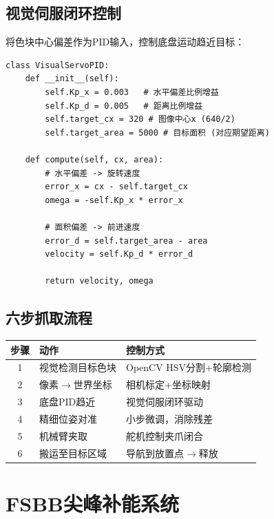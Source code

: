 \documentclass[12pt,a4paper]{ctexart}
\begin{document}
\subsection{视觉伺服闭环控制}

将色块中心偏差作为PID输入，控制底盘运动趋近目标：

\begin{lstlisting}[style=pythonstyle, caption={视觉伺服PID闭环底盘控制}]
class VisualServoPID:
    def __init__(self):
        self.Kp_x = 0.003   # 水平偏差比例增益
        self.Kp_d = 0.005   # 距离比例增益
        self.target_cx = 320 # 图像中心x (640/2)
        self.target_area = 5000 # 目标面积 (对应期望距离)

    def compute(self, cx, area):
        # 水平偏差 -> 旋转速度
        error_x = cx - self.target_cx
        omega = -self.Kp_x * error_x

        # 面积偏差 -> 前进速度
        error_d = self.target_area - area
        velocity = self.Kp_d * error_d

        return velocity, omega
\end{lstlisting}

\subsection{六步抓取流程}

\begin{center}
\begin{tabular}{cll}
\toprule
\textbf{步骤} & \textbf{动作} & \textbf{控制方式} \\
\midrule
1 & 视觉检测目标色块 & OpenCV HSV分割+轮廓检测 \\
2 & 像素$\to$世界坐标 & 相机标定+坐标映射 \\
3 & 底盘PID趋近 & 视觉伺服闭环驱动 \\
4 & 精细位姿对准 & 小步微调，消除残差 \\
5 & 机械臂夹取 & 舵机控制夹爪闭合 \\
6 & 搬运至目标区域 & 导航到放置点$\to$释放 \\
\bottomrule
\end{tabular}
\end{center}

\newpage
\section{FSBB尖峰补能系统}
\end{document}
